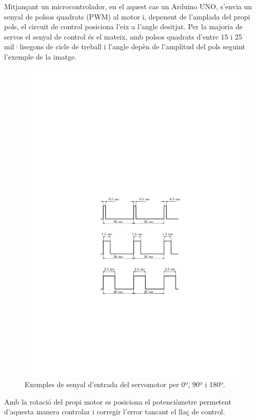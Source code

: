 Mitjançant un microcontrolador, en el aquest cas un Arduino UNO, s’envia un senyal de polsos quadrats (PWM) al motor i, depenent de l’amplada del propi pols, el circuit de control posiciona l’eix a l’angle desitjat. Per la majoria de servos el senyal de control és el mateix, amb polsos quadrats d’entre 15 i 25 mil·lisegons de cicle de treball i l’angle depèn de l’amplitud del pols seguint l’exemple de la imatge. 
\begin{figure}[H]
	\centering
	\includegraphics{senyal_servo}
	\caption{Exemples de senyal d'entrada del servomotor per 0º, 90º i 180º.}
	\label{fig:entradaservo}
\end{figure}

Amb la rotació del propi motor es posiciona el potenciòmetre permetent d’aquesta manera controlar i corregir l’error tancant el llaç de control.  


